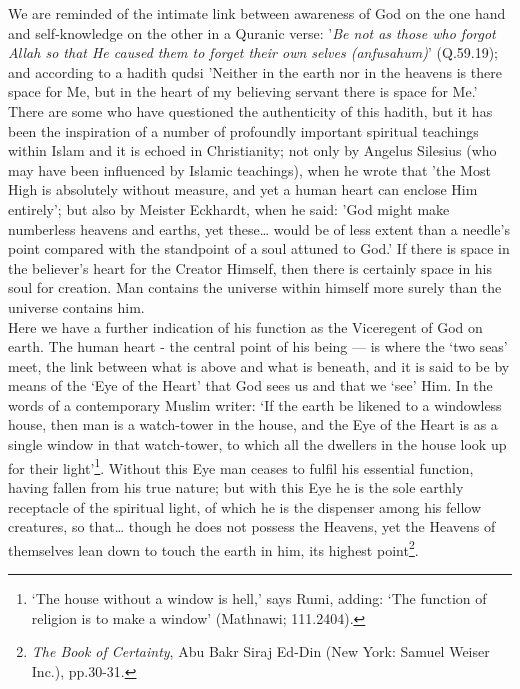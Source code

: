 \documentclass[10pt, twoside]{book}
\begin{document}
We are reminded of the intimate link between awareness of God on the one hand and self\hyp{}knowledge on 
the other in a Quranic verse: '\emph{Be not as those who forgot Allah so that He caused them to forget 
their own selves (anfusahum)}' (Q.59.19); and according to a hadith qudsi 'Neither in the earth nor in 
the heavens is there space for Me, but in the heart of my believing servant there is space for Me.' 
There are some who have questioned the authenticity of this hadith, but it has been the inspiration 
of a number of profoundly important spiritual teachings within Islam and it is echoed in 
Christianity; not only by Angelus Silesius (who may have been influenced by Islamic teachings), when 
he wrote that 'the Most High is absolutely without measure, and yet a human heart can enclose Him 
entirely'; but also by Meister Eckhardt, when he said: 'God might make numberless heavens and earths, 
yet these\ldots{} would be of less extent than a needle's point compared with the standpoint of a soul 
attuned to God.' If there is space in the believer's heart for the Creator Himself, then there is 
certainly space in his soul for creation. Man contains the universe within himself more surely than 
the universe contains him. \\

Here we have a further indication of his function as the Viceregent of God on earth. The human heart 
- the central point of his being --- is where the `two seas' meet, the link between what is above and 
what is beneath, and it is said to be by means of the `Eye of the Heart' that God sees us and that we 
`see' Him. In the words of a contemporary Muslim writer: `If the earth be likened to a windowless 
house, then man is a watch\hyp{}tower in the house, and the Eye of the Heart is as a single window in that 
watch\hyp{}tower, to which all the dwellers in the house look up for their light'\footnote{`The house without a window is hell,' says Rumi, adding: `The function of religion is to make a 
window' (Mathnawi; 111.2404).}. Without this Eye man 
ceases to fulfil his essential function, having fallen from his true nature; but with this Eye he is 
the sole earthly receptacle of the spiritual light, of which he is the dispenser among his fellow 
creatures, so that\ldots{} though he does not possess the Heavens, yet the Heavens of themselves lean 
down to touch the earth in him, its highest point\footnote{\emph{The Book of Certainty}, Abu Bakr Siraj Ed\hyp{}Din (New York: Samuel Weiser Inc.), pp.30-31.}. \\
\end{document}
